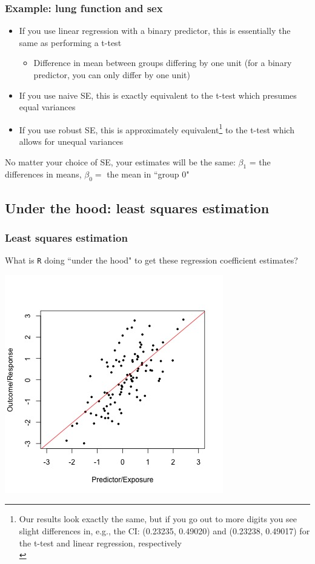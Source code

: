 \documentclass[12pt, 
hyperref={colorlinks=true, linkcolor=blue, urlcolor=cyan}]{beamer}
\begin{document}
\begin{frame}
\frametitle{Example: lung function and sex}

\begin{itemize}
\item \color{blue} If you use linear regression with a binary predictor, this is essentially the same as performing a t-test \color{black}
	\begin{itemize}
	\item Difference in mean between groups differing by one unit (for a binary predictor, you can only differ by one unit)
	\end{itemize}
\item If you use naive SE, this is exactly equivalent to the t-test which presumes equal variances
\item If you use robust SE, this is approximately equivalent\footnote[frame]{Our results look exactly the same, but if you go out to more digits you see slight differences in, e.g., the CI: (0.23235, 0.49020) and (0.23238, 0.49017) for the t-test and linear regression, respectively\\} to the t-test which allows for unequal variances
\end{itemize}

\vspace{-0.2cm} No matter your choice of SE, your estimates will be the same: $\beta_1$ = the differences in means, $\beta_0 = $ the mean in ``group 0"


\end{frame}

\subsection{Under the hood: least squares estimation}
\begin{frame}
\frametitle{Least squares estimation}
What is \texttt{R} doing ``under the hood" to get these regression coefficient estimates?\vspace{-0.5cm} \pause 

\center \includegraphics[height=0.8\textheight]{./plots/linear-regr}
\end{frame}
\end{document}
